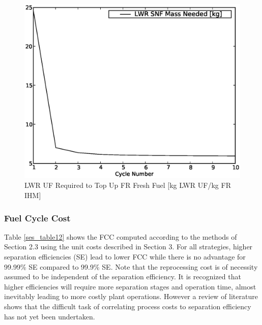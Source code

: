 \begin{figure}[htbp]
\caption{LWR UF Required to Top Up FR Fresh Fuel [kg LWR UF/kg FR IHM]}
\label{ses_fig10}
\begin{center}
\includegraphics[scale=0.5]{se_sensitivity/figs/LWRsnfNeeded.eps}
\end{center}
\end{figure}


\subsubsection{Fuel Cycle Cost}
\label{ses_sec:fcc}
Table \ref{ses_table12} shows the FCC computed according to the methods of Section 2.3
using the unit costs described in Section 3. For all strategies, higher
separation efficiencies (SE) lead to lower FCC while there is no
advantage for 99.99\% SE compared to 99.9\% SE.  Note that the
reprocessing cost is of necessity assumed to be independent of the
separation efficiency.  It is recognized that higher efficiencies will
require more separation stages and operation time, almost inevitably
leading to more costly plant operations.  However a review of literature
shows that the difficult task of correlating process costs to separation
efficiency has not yet been undertaken.

